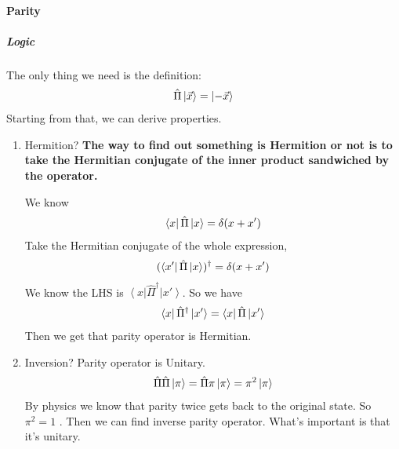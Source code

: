 \documentclass[letterpaper,10pt,english]{sphinxmanual}
\newcommand{\bra}[1]{\left\langle #1\right|}
\newcommand{\ket}[1]{\left| #1\right\rangle}
\begin{document}
\paragraph{Parity}
\label{Quantum/symmetries:parity}

\subparagraph{Logic}
\label{Quantum/symmetries:logic}
The only thing we need is the definition:
\begin{gather}
\begin{split}\hat \Pi \ket{\vec x} = \ket{-\vec x}\end{split}\notag
\end{gather}
Starting from that, we can derive properties.
\begin{enumerate}
\item {} 
Hermition? \textbf{The way to find out something is Hermition or not is to take the Hermitian conjugate of the inner product sandwiched by the operator.}

We know
\begin{gather}
\begin{split}\bra{x}\hat \Pi \ket{x} = \delta(x+x')\end{split}\notag
\end{gather}
Take the Hermitian conjugate of the whole expression,
\begin{gather}
\begin{split}(\bra{x'}\hat \Pi \ket{x} )^\dagger = \delta(x+x')\end{split}\notag
\end{gather}
We know the LHS is \(\bra{x}\hat \Pi^\dagger \ket{x'}\). So we have
\begin{gather}
\begin{split}\bra{x}\hat \Pi^\dagger \ket{x'}  =  \bra{x}\hat \Pi \ket{x'}\end{split}\notag
\end{gather}
Then we get that parity operator is Hermitian.

\item {} 
Inversion? Parity operator is Unitary.
\begin{gather}
\begin{split}\hat \Pi \hat \Pi \ket{\pi} = \hat \Pi \pi \ket{\pi} = \pi^2\ket{\pi}\end{split}\notag
\end{gather}
By physics we know that parity twice gets back to the original state. So \(\pi^2=1\) . Then we can find inverse parity operator. What's important is that it's unitary.


\end{enumerate}
\end{document}
